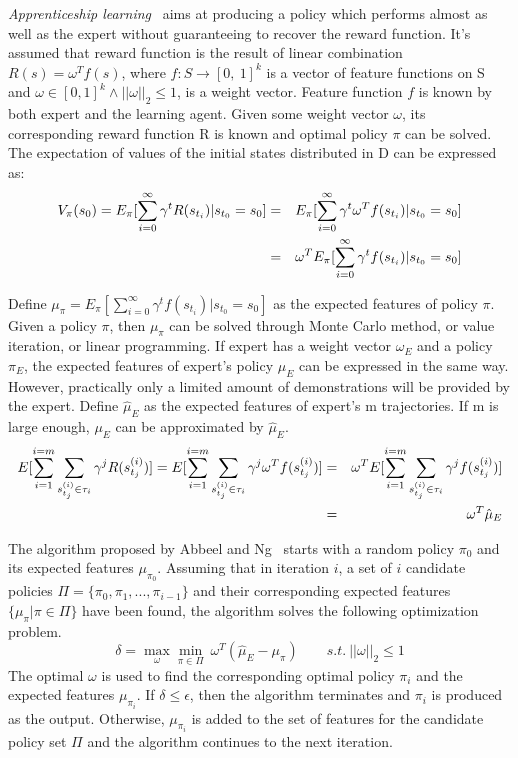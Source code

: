\emph {Apprenticeship learning}~\cite{Abbeel:2004:ALV:1015330.1015430} aims at producing a policy which performs almost as well as the expert without guaranteeing to recover the reward function. It's assumed that reward function is the result of linear combination $R(s) = \omega^Tf(s)$, where $f:S \to [0,\ 1]^k$ is a vector of feature functions on S and $\omega \in [0, 1]^k \wedge ||\omega||_2\leq 1$, is a weight vector. Feature function $f$ is known by both expert and the learning agent. Given some weight vector $\omega$, its corresponding reward function R is known and optimal policy $\pi$ can be solved. The expectation of values of the initial states distributed in D can be expressed as:
\begin{eqnarray}
\centering
V_{\pi}({s_0}) = E_{\pi}[\sum^{\infty}_{i=0}\gamma^t R(s_{t_i})|s_{t_0}=s_0] &=& E_{\pi}[\sum^{\infty}_{i=0}\gamma^t \omega^Tf(s_{t_i})|s_{t_0}=s_0]\nonumber\\
						&=& \omega^T E_{\pi}[\sum^\infty_{i=0}\gamma^t f(s_{t_i})|s_{t_0}=s_0]
\end{eqnarray}

Define $\mu_{\pi}= E_{\pi}[\sum^\infty_{i=0}\gamma^t f(s_{t_i})|s_{t_0}=s_0]$ as the expected features of policy $\pi$. Given a policy $\pi$, then $\mu_\pi$ can be solved through Monte Carlo method, or value iteration, or linear programming. If expert has a weight vector $\omega_E$ and a policy $\pi_E$, the expected features of expert's policy $\mu_E$ can be expressed in the same way. However, practically only a limited amount of demonstrations will be provided by the expert. Define $\hat{\mu}_E$ as the expected features of expert's m trajectories. If m is large enough, $\mu_E$ can be approximated by $\hat{\mu}_E$.
\begin{eqnarray}
\centering
E[\sum_{i=1}^{i=m}\sum_{s^{(i)}_{t_j}\in \tau_i}\gamma^j R(s^{(i)}_{t_j})] 
= E[\sum_{i=1}^{i=m}\sum_{s^{(i)}_{t_j}\in \tau_i}\gamma^j \omega^Tf(s^{(i)}_{t_j})]
&=& \omega^T E[\sum_{i=1}^{i=m}\sum_{s^{(i)}_{t_j}\in \tau_i}\gamma^j f(s^{(i)}_{t_j})]\nonumber\\ 
&=& \omega^T \hat{\mu}_E 
\end{eqnarray}

The algorithm proposed by Abbeel and Ng~\cite{Abbeel:2004:ALV:1015330.1015430} starts with a random policy $\pi_0$ and its expected features $\mu_{\pi_0}$. Assuming that in iteration $i$, a set of $i$ candidate policies $\Pi=\{\pi_0, \pi_1, ..., \pi_{i-1}\}$ and their corresponding expected features $\{\mu_\pi|\pi\in\Pi\}$ have been found, the algorithm solves the following optimization problem.
\begin{equation}
\delta = \max\limits_{\omega}\min\limits_{\pi\in\Pi}\ \omega^T(\hat{\mu}_E - \mu_{\pi})\qquad s.t.\:||\omega||_2\leq 1 
\label{eq:sec1_1}
\end{equation}
The optimal $\omega$ is used to find the corresponding optimal policy $\pi_{i}$ and the expected features $\mu_{\pi_i}$. If $\delta\leq\epsilon$, then the algorithm terminates and $\pi_{i}$ is produced as the output. Otherwise, $\mu_{\pi_i}$ is added to the set of features for the candidate policy set $\Pi$ and the algorithm continues to the next iteration. 

